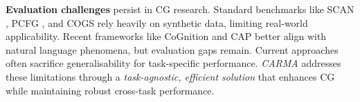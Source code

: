 \noindent\textbf{Evaluation challenges} persist in CG research. Standard benchmarks like SCAN \cite{Lake2017GeneralizationWS}, PCFG \cite{ijcai2020p708}, and COGS \cite{kim-linzen-2020-cogs} rely heavily on synthetic data, limiting real-world applicability. Recent frameworks like CoGnition \cite{li-etal-2021-compositional} and CAP \cite{aljaafari2024interpreting} better align with natural language phenomena, but evaluation gaps remain. Current approaches often sacrifice generalisability for task-specific performance. \textit{CARMA} addresses these limitations through a \textit{task-agnostic, efficient solution} that enhances CG while maintaining robust cross-task performance.


